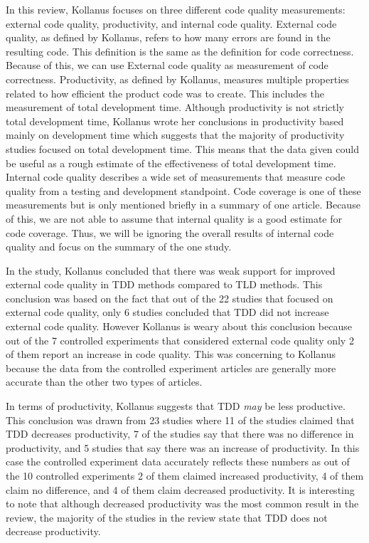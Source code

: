 \documentclass{sig-alternate}
\begin{document}
In this review, Kollanus focuses on three different code quality measurements: external code quality, productivity, and internal code quality.  External code quality, as defined by Kollanus, refers to how many errors are found in the resulting code.  This definition is the same as the definition for code correctness.  Because of this, we can use External code quality as measurement of code correctness.  Productivity, as defined by Kollanus, measures multiple properties related to how efficient the product code was to create.  This includes the measurement of total development time.  Although productivity is not strictly total development time, Kollanus wrote her conclusions in productivity based mainly on development time which suggests that the majority of productivity studies focused on total development time.  This means that the data given could be useful as a rough estimate of the effectiveness of total development time.
Internal code quality describes a wide set of measurements that measure code quality from a testing and development standpoint.  Code coverage is one of these measurements but is only mentioned briefly in a summary of one article.  Because of this, we are not able to assume that internal quality is a good estimate for code coverage.  Thus, we will be ignoring the overall results of internal code quality and focus on the summary of the one study.


 In the study, Kollanus concluded that there was weak support for improved external code quality in TDD methods compared to TLD methods.  This conclusion was based on the fact that out of the 22 studies that focused on external code quality, only 6 studies concluded that TDD did not increase external code quality.  However Kollanus is weary about this conclusion because out of the 7 controlled experiments that considered external code quality only 2 of them report an increase in code quality.  This was concerning to Kollanus because the data from the controlled experiment articles are generally more accurate than the other two types of articles.  
 
In terms of productivity, Kollanus suggests that TDD \textit{may} be less productive. This conclusion was drawn from 23 studies where 11 of the studies claimed that TDD decreases productivity, 7 of the studies say that there was no difference in productivity, and 5 studies that say there was an increase of productivity.  In this case the controlled experiment data accurately reflects these numbers as out of the 10 controlled experiments 2 of them claimed increased productivity, 4 of them claim no difference, and 4 of them claim decreased productivity.  It is interesting to note that although decreased productivity was the most common result in the review, the majority of the studies in the review state that TDD does not decrease productivity.
 
\end{document}
